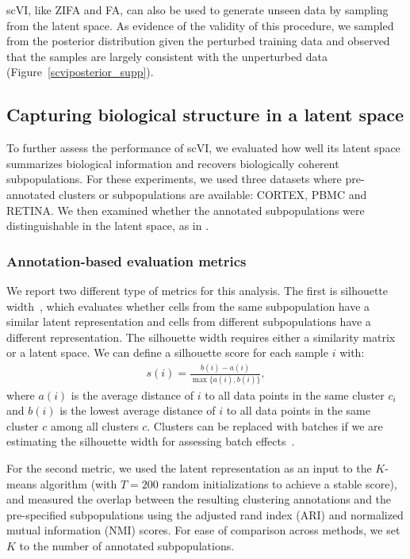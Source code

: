 scVI, like ZIFA and FA, can also be used to generate unseen data by sampling from the latent space. As evidence of the validity of this procedure, we sampled from the posterior distribution given the perturbed training data and observed that the samples are largely consistent with the unperturbed data (Figure~\ref{scviposterior_supp}).


\subsection{Capturing biological structure in a latent space}
\label{scviclustering_results}
To further assess the performance of scVI, we evaluated how well its latent space summarizes biological information and recovers biologically coherent subpopulations. For these experiments, we used three datasets where pre-annotated clusters or subpopulations are available: CORTEX, PBMC and RETINA. We then examined whether the annotated subpopulations were distinguishable in the latent space, as in \cite{Wang2017}. 

\subsubsection{Annotation-based evaluation metrics}
We report two different type of metrics for this analysis. The first is silhouette width~\cite{ROUSSEEUW198753}, which evaluates whether cells from the same subpopulation have a similar latent representation and cells from different subpopulations have a different representation. The silhouette width requires either a similarity matrix or a latent space. We can define a silhouette score for each sample $i$ with:
\begin{align}
    s(i) = \frac{b(i) - a(i)}{\max\{a(i),b(i)\}}, 
\end{align}
where $a(i)$ is the average distance of $i$ to all data points in the same cluster $c_i$ and $b(i)$ is the lowest average distance of $i$ to all data points in the same cluster $c$ among all clusters $c$. Clusters can be replaced with batches if we are estimating the silhouette width for assessing batch effects~\cite{SCONE}.

For the second metric, we used the latent representation as an input to the $K$-means algorithm (with $T=200$ random initializations to achieve a stable score), and measured the overlap between the resulting clustering annotations and the pre-specified subpopulations using the adjusted rand index (ARI) and normalized mutual information (NMI) scores. For ease of comparison across methods, we set $K$ to the number of annotated subpopulations.

